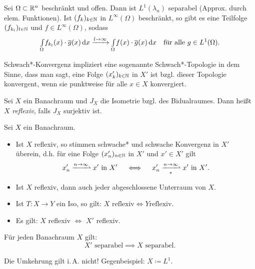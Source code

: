 \documentclass{cheat-sheet}
\newcommand{\IntO}[2]{\Int{\Omega}{}{#1}{#2}} %
\newcommand{\convWith}[1]{\xrightarrow{#1 \to \infty}} %
\newcommand{\convWeaklyWith}[1]{\xrightharpoonup{#1 \to \infty}} %
\newcommand{\convWeaklyStarWith}[1]{\xrightharpoonup[*]{#1 \to \infty}} %
\begin{document}
\begin{bsp}
  Sei $\Omega \subset \mathbb{R}^n$ beschränkt und offen. Dann ist $L^1(\lambda_n)$ separabel (Approx. durch elem. Funktionen). Ist $(f_k)_{k \in \mathbb{N}}$ in $L^{\infty}(\Omega)$ beschränkt, so gibt es eine Teilfolge $(f_{k_l})_{l \in \mathbb{N}}$ und $f \in L^\infty(\Omega)$, sodass
  \[ \IntO{f_{k_l}(x) \cdot \overline{g}(x)}{x} \convWith{l} \IntO{f(x) \cdot \overline{g}(x)}{x} \quad \text{für alle $g \in L^1(\Omega)$}. \]
\end{bsp}

\begin{bem}
  Schwach*-Konvergenz impliziert eine sogenannte Schwach*-Topologie in dem Sinne, dass man sagt, eine Folge $(x_k')_{k \in \mathbb{N}}$ in $X'$ ist bzgl. dieser Topologie konvergent, wenn sie punktweise für alle $x \in X$ konvergiert.
\end{bem}

\begin{defn}
  Sei $X$ ein Banachraum und $J_X$ die Isometrie bzgl. des Bidualraumes. Dann heißt $X$ \emph{reflexiv}, falls $J_X$ surjektiv ist.
\end{defn}

\begin{lem}
  Sei $X$ ein Banachraum.
  \begin{itemize}
    \item Ist $X$ reflexiv, so stimmen schwache* und schwache Konvergenz in $X'$ überein, d.h. für eine Folge $(x'_n)_{n \in \mathbb{N}}$ in $X'$ und $x' \in X'$ gilt
    \[ x_n' \convWeaklyWith{n} x' \text{ in } X' \quad \iff \quad x_n' \convWeaklyStarWith{n} x' \text{ in } X'. \]
    \item Ist $X$ reflexiv, dann auch jeder abgeschlossene Unterraum von $X$.
    \item Ist $T : X \to Y$ ein Iso, so gilt: $X \text{ reflexiv} \iff Y \text{reflexiv}$.
    \item Es gilt: $X$ reflexiv $\iff$ $X'$ reflexiv.
  \end{itemize}
\end{lem}


\begin{lem}
  Für jeden Banachraum $X$ gilt:
  \[ X' \text{ separabel} \implies X \text{ separabel.} \]
\end{lem}

\begin{bem}
  Die Umkehrung gilt i.\,A. nicht! Gegenbeispiel: $X \coloneqq L^1$.
\end{bem}
\end{document}
